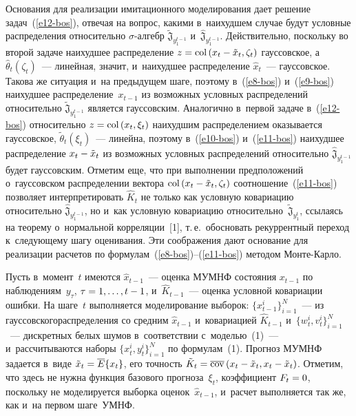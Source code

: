 \begin{multicols}{2}
    Основания для реализации имитационного моделирования дает решение 
задач~(\ref{e12-bos}), отвечая на вопрос, какими в~наихудшем случае будут 
условные распределения относительно $\sigma$-ал\-гебр 
$\tilde{\mathfrak{J}}_{y_1^{t-1}}$ и~$\hat{\mathfrak{J}}_{y_1^{t-1}}$. 
Действительно, поскольку во второй задаче наихудшее распределение $z\hm= 
\mathrm{col}\left (x_t\hm- \tilde{x}_t, \zeta_t\right)$ гауссовское, а $\hat{\theta}_t(\zeta_t)$~--- 
линейная, значит, и~наихудшее распределение $\hat{x}_t$~--- гауссовское. 
Такова же ситуация и~на предыдущем шаге, поэтому в~(\ref{e8-bos}) 
и~(\ref{e9-bos}) наихудшее распределение~$x_{t-1}$ из возможных условных 
распределений относительно $\tilde{\mathfrak{J}}_{y_1^{t-1}}$ является 
гауссовским. Аналогично в~первой задаче в~(\ref{e12-bos}) относительно 
$z\hm= \mathrm{col}\left (x_t, \xi_t\right)$ наихудшим распределением оказывается гауссовское, 
$\tilde{\theta}_t\left(\xi_t\right)$~--- линейна, 
поэтому в~(\ref{e10-bos}) и~(\ref{e11-bos}) 
наихудшее распределение $x_t\hm-\tilde{x}_t$ из возможных условных 
распределений относительно $\hat{\mathfrak{J}}_{y_1^{t-1}}$ будет 
гауссовским. Отметим еще, что при выполнении предположений 
о~гауссовском распределении вектора  
$\mathrm{col}\left (x_t \hm- \tilde{x}_t, \zeta_t\right)$ соотношение~(\ref{e11-bos}) 
позволяет интерпретировать $\hat{K}_t$  не только как условную ковариацию относительно 
$\hat{\mathfrak{J}}_{y_1^{t-1}}$, но и~как условную ковариацию 
относительно~$\tilde{\mathfrak{J}}_{y_1^{t}}$, 
ссылаясь на теорему о~нормальной корреляции~[1], т.\,е.\
 обосновать рекуррентный переход к~следующему шагу оценивания. 
Эти соображения дают основание для реализации расчетов по 
формулам~(\ref{e8-bos})--(\ref{e11-bos}) методом Мон\-те-Карло.
    
    Пусть в~момент~$t$ имеются $\hat{x}_{t-1}$~--- оценка МУМНФ состояния 
$x_{t-1}$ по наблюдениям~$y_\tau$, $\tau\hm=1,\ldots , t\hm-1$,  
и~$\hat{K}_{t-1}$~--- оценка условной ковариации ошибки. На шаге~$t$ 
выполняется моделирование выборок: $\{x^i_{t-1}\}^N_{i=1}$~--- из 
гауссовского\linebreak распределения со средним $\hat{x}_{t-1}$ и~ковариацией 
$\hat{K}_{t-1}$ и~$\{ w^i_t, v_t^i\}^N_{i=1}$~--- дискретных белых шумов 
в~соответствии с~моделью~(1)~--- и~рассчитываются наборы $\{x_t^i, 
y_t^i\}^N_{i=1}$ по формулам~(1). Прогноз МУМНФ задается в~виде 
$\tilde{x}_t\hm=\overline{E}\{x_t\}$, его точность $\tilde{K}_t\hm= 
\overline{\mathrm{cov}}\left(x_t\hm- \tilde{x}_t, x_t\hm- \tilde{x}_t\right)$. Отметим, что здесь не 
нужна функция базового прогноза~$\xi_t$, коэффициент $F_t\hm=0$, 
поскольку не моделируется выборка оценок~$\hat{x}_{t-1}$, и~расчет 
выполняется так же, как и~на первом шаге~УМНФ.
{ %

}
\end{multicols}
